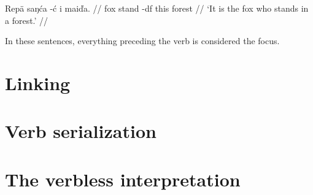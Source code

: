 \ex
\begingl
\gla Rep\"a saŋ\'ca -\'c      i    mai\v{d}a. //
\glb fox    stand   -{\sc df} this forest //
\glft `It is the fox who stands in a forest.' //
\endgl
\xe

\noindent In these sentences, everything preceding the verb is considered the
focus.

\section{Linking}\label{s:linking}
\section{Verb serialization}
\section{The verbless interpretation}
